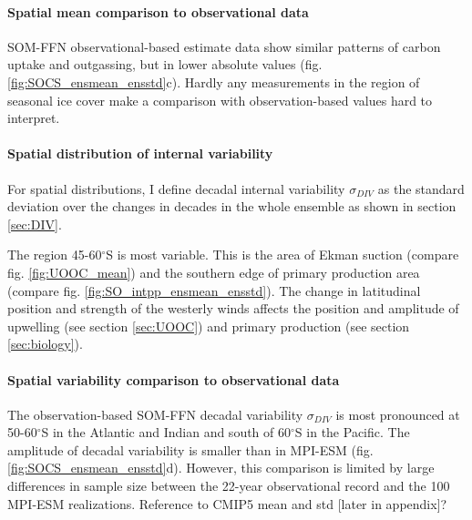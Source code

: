 \documentclass[12pt]{article}
\begin{document}
 
\paragraph{Spatial mean comparison to observational data}
SOM-FFN observational-based estimate data show similar patterns of  carbon uptake and outgassing, but in lower absolute values (fig. \ref{fig:SOCS_ensmean_ensstd}c). 
Hardly any measurements in the region of seasonal ice cover make a comparison with observation-based values hard to interpret. 

\paragraph{Spatial distribution of internal variability} 
For spatial distributions, I define decadal internal variability $\sigma_{DIV}$ as the standard deviation over the changes in decades in the whole ensemble as shown in section \ref{sec:DIV}.

The region 45-60$^\circ$S is most variable. This is the area of Ekman suction (compare fig. \ref{fig:UOOC_mean}) and the southern edge of primary production area (compare fig. \ref{fig:SO_intpp_ensmean_ensstd}). The change in latitudinal position and strength of the westerly winds affects the position and amplitude of upwelling (see section \ref{sec:UOOC}) and primary production (see section \ref{sec:biology}).

\paragraph{Spatial variability comparison to observational data}
The observation-based SOM-FFN decadal variability $\sigma_{DIV}$ is most pronounced at 50-60$^\circ$S in the Atlantic and Indian and south of 60$^\circ$S in the Pacific. The amplitude of decadal variability is smaller than in MPI-ESM (fig. \ref{fig:SOCS_ensmean_ensstd}d). However, this comparison is limited by large differences in sample size between the 22-year observational record and the 100 MPI-ESM realizations. %
Reference to CMIP5 mean and std [later in appendix]?
\end{document}
